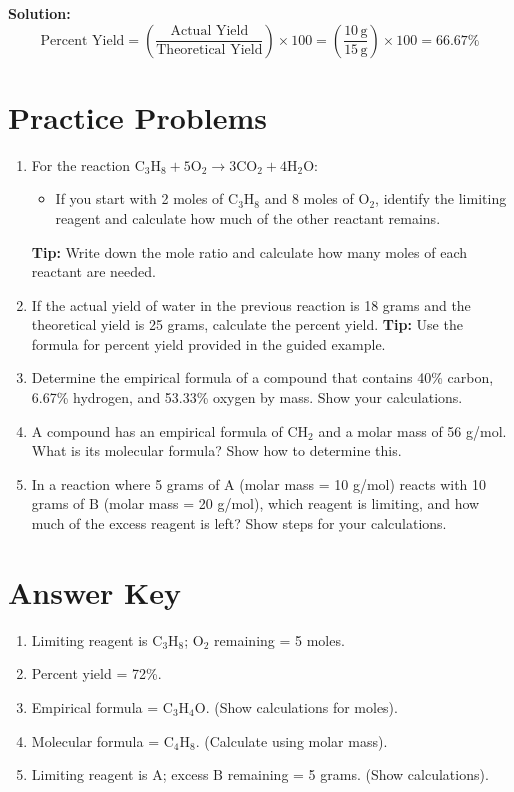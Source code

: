 \documentclass[12pt]{article}
\begin{document}
\textbf{Solution:}
\[
\text{Percent Yield} = \left( \frac{\text{Actual Yield}}{\text{Theoretical Yield}} \right) \times 100 = \left( \frac{10 \, \text{g}}{15 \, \text{g}} \right) \times 100 = 66.67\%
\]

\section*{Practice Problems}
\begin{enumerate}
    \item For the reaction \( \text{C}_3\text{H}_8 + 5 \text{O}_2 \rightarrow 3 \text{CO}_2 + 4 \text{H}_2\text{O} \):
    \begin{itemize}
        \item If you start with 2 moles of \(\text{C}_3\text{H}_8\) and 8 moles of \(\text{O}_2\), identify the limiting reagent and calculate how much of the other reactant remains.
    \end{itemize}
    \textbf{Tip:} Write down the mole ratio and calculate how many moles of each reactant are needed.

    \item If the actual yield of water in the previous reaction is 18 grams and the theoretical yield is 25 grams, calculate the percent yield.
    \textbf{Tip:} Use the formula for percent yield provided in the guided example.

    \item Determine the empirical formula of a compound that contains 40\% carbon, 6.67\% hydrogen, and 53.33\% oxygen by mass. Show your calculations.

    \item A compound has an empirical formula of \(\text{CH}_2\) and a molar mass of 56 g/mol. What is its molecular formula? Show how to determine this.

    \item In a reaction where 5 grams of \(\text{A}\) (molar mass = 10 g/mol) reacts with 10 grams of \(\text{B}\) (molar mass = 20 g/mol), which reagent is limiting, and how much of the excess reagent is left? Show steps for your calculations.
\end{enumerate}

\section*{Answer Key}
\begin{enumerate}
    \item Limiting reagent is \(\text{C}_3\text{H}_8\); \(\text{O}_2\) remaining = 5 moles.
    \item Percent yield = 72\%.
    \item Empirical formula = \(\text{C}_3\text{H}_4\text{O}\). (Show calculations for moles).
    \item Molecular formula = \(\text{C}_4\text{H}_8\). (Calculate using molar mass).
    \item Limiting reagent is \(\text{A}\); excess \(\text{B}\) remaining = 5 grams. (Show calculations).
\end{enumerate}
\end{document}
